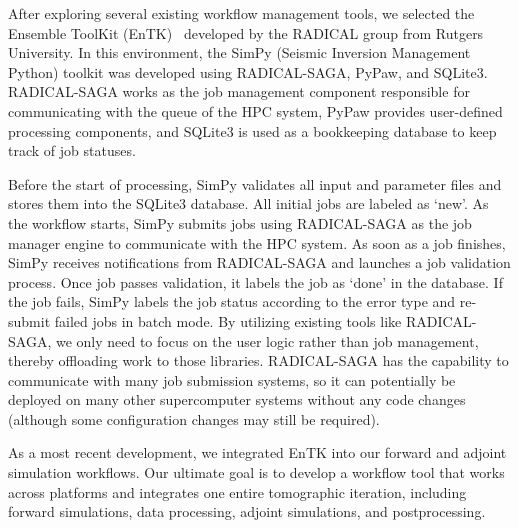 After exploring several existing workflow management tools,
we selected the Ensemble ToolKit (EnTK)~\cite{EnTK2017} developed by the RADICAL
group from Rutgers University.
In this environment,
the SimPy (Seismic Inversion Management Python) toolkit was developed using RADICAL-SAGA, PyPaw, and SQLite3.
RADICAL-SAGA works as the 
job management component responsible for communicating with the queue of the HPC system,
PyPaw provides user-defined processing components,
and SQLite3 is used as a bookkeeping database to keep track of job statuses.

Before the start of processing,
SimPy validates all input and parameter files and stores them
into the SQLite3 database.
All initial jobs are labeled as `new'.
As the workflow starts, SimPy submits jobs using 
RADICAL-SAGA as the job manager engine to communicate with the HPC system.
As soon as a job finishes, SimPy receives notifications from
RADICAL-SAGA and launches a job validation process.
Once job passes validation,
it labels the job as `done' in the database.
If the job fails, SimPy labels
the job status according to the error type and re-submit failed jobs in batch mode.
By utilizing existing tools like RADICAL-SAGA, we only need to focus on the user logic rather
than job management, thereby offloading work to those libraries.
RADICAL-SAGA has the capability to communicate with many job submission systems,
so it can potentially be deployed on many other supercomputer systems without any
code changes (although some configuration changes may still be required).

As a most recent development, we integrated EnTK
into our forward and adjoint simulation workflows. Our ultimate
goal is to develop a workflow tool that works across platforms and integrates one entire tomographic iteration, including forward simulations, data processing, adjoint simulations, and postprocessing.
